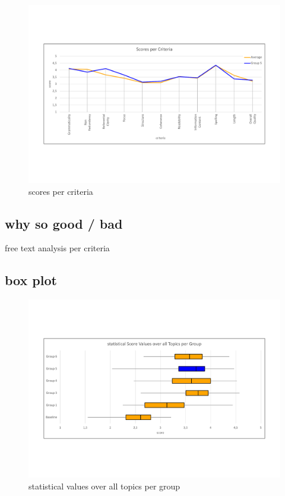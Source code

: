\begin{figure}[H]
	\centering
	\includegraphics[trim= 0 150 0 150,width=\textwidth]{img/scores_per_criteria.pdf}
	\caption{scores per criteria}
	\label{fig:spc}
\end{figure}

\subsection{why so good / bad}
free text analysis per criteria


\subsection{box plot}

\begin{figure}[H]
	\centering
	\includegraphics[trim= 0 150 0 150,width=\textwidth]{img/box.pdf}
	\caption{statistical values over all topics per group}
	\label{fig:svg}
\end{figure}


